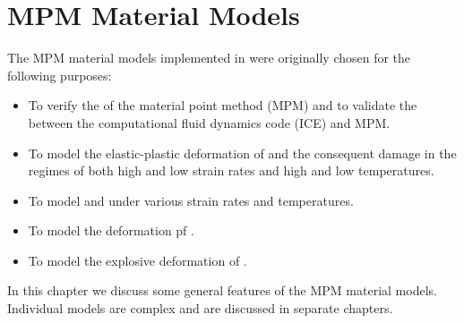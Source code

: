 
\chapter{MPM Material Models}
The MPM material models implemented in \Vaango were originally
chosen for the following purposes:
\begin{itemize}
  \item To verify the  of the material point method (MPM)
        and to validate the  between the computational fluid 
        dynamics code (ICE) and MPM.
  \item To model the elastic-plastic deformation of  
        and the consequent damage in the regimes of 
        both high and low strain rates and high and low temperatures.
  \item To model  and 
        under various strain rates and temperatures.
  \item To model the deformation pf .
  \item To model the explosive deformation of .
\end{itemize}
In this chapter we discuss some general features of the MPM material
models.  Individual models are complex and are discussed in separate
chapters.

